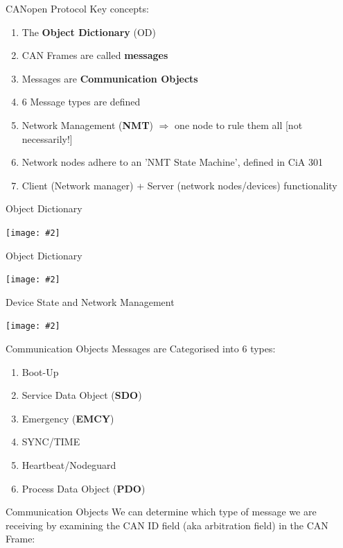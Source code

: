 \documentclass{beamer}
\newcommand {\framedgraphic}[2] {
    \begin{frame}{#1}
        \begin{center}
            \texttt{[image: \#2]}
        \end{center}
    \end{frame}
}
\begin{document}
     \begin{frame}{CANopen Protocol}
       Key concepts:
       \begin{enumerate}
       \item{The \textbf{Object Dictionary} (OD)}\pause
       \item{CAN Frames are called \textbf{messages}}\pause
       \item{Messages are \textbf{Communication Objects}}\pause
       \item{6 Message types are defined}\pause
       \item{Network Management (\textbf{NMT}) $\Rightarrow$ one node to rule them all [not necessarily!]}  \pause
       \item{Network nodes  adhere to an 'NMT State Machine', defined in CiA 301}\pause
       \item{Client (Network manager) + Server (network nodes/devices) functionality}
       
       \end{enumerate}
     \end{frame}

     \framedgraphic{Object Dictionary}{./images/object_dictionary}
     \framedgraphic{Object Dictionary}{./images/object_dictionary_ac}

     \framedgraphic{Device State and Network Management}{./images/NMT_states}
     
     \begin{frame}{Communication Objects}
       Messages are Categorised into 6 types:
       \begin{enumerate}
       \item{Boot-Up}\pause
       \item{Service Data Object (\textbf{SDO})}\pause
       \item{Emergency (\textbf{EMCY})}\pause
       \item{SYNC/TIME}\pause
       \item{Heartbeat/Nodeguard}\pause
       \item{Process Data Object (\textbf{PDO})}
       \end{enumerate}  
     \end{frame}

     \begin{frame}{Communication Objects}
       We can determine which type of message we are receiving by examining the CAN ID field (aka arbitration field) in the CAN Frame:

       \end{frame}
\end{document}
